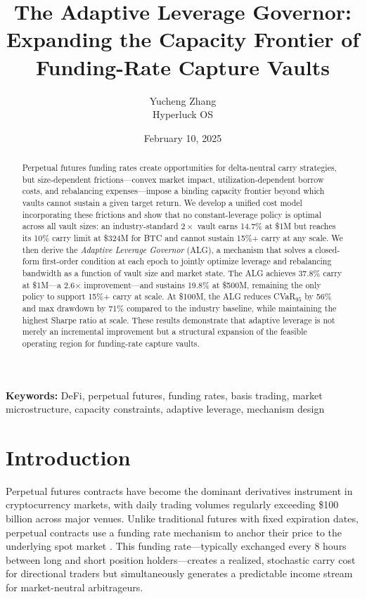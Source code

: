 \documentclass[11pt]{article}
\title{The Adaptive Leverage Governor:\\ Expanding the Capacity Frontier of Funding-Rate Capture Vaults}
\author{Yucheng Zhang\\[0.2cm]
Hyperluck OS}
\date{February 10, 2025}
\begin{document}
\maketitle

\begin{abstract}
Perpetual futures funding rates create opportunities for delta-neutral carry strategies, but size-dependent frictions---convex market impact, utilization-dependent borrow costs, and rebalancing expenses---impose a binding capacity frontier beyond which vaults cannot sustain a given target return. We develop a unified cost model incorporating these frictions and show that no constant-leverage policy is optimal across all vault sizes: an industry-standard $2\times$ vault earns 14.7\% at \$1M but reaches its 10\% carry limit at \$324M for BTC and cannot sustain 15\%+ carry at any scale. We then derive the \textit{Adaptive Leverage Governor} (ALG), a mechanism that solves a closed-form first-order condition at each epoch to jointly optimize leverage and rebalancing bandwidth as a function of vault size and market state. The ALG achieves 37.8\% carry at \$1M---a 2.6$\times$ improvement---and sustains 19.8\% at \$500M, remaining the only policy to support 15\%+ carry at scale. At \$100M, the ALG reduces CVaR$_{95}$ by 56\% and max drawdown by 71\% compared to the industry baseline, while maintaining the highest Sharpe ratio at scale. These results demonstrate that adaptive leverage is not merely an incremental improvement but a structural expansion of the feasible operating region for funding-rate capture vaults.
\end{abstract}

\textbf{Keywords:} DeFi, perpetual futures, funding rates, basis trading, market microstructure, capacity constraints, adaptive leverage, mechanism design

\section{Introduction}

Perpetual futures contracts have become the dominant derivatives instrument in cryptocurrency markets, with daily trading volumes regularly exceeding \$100 billion across major venues. Unlike traditional futures with fixed expiration dates, perpetual contracts use a funding rate mechanism to anchor their price to the underlying spot market \citep{perpetuals_mechanism}. This funding rate---typically exchanged every 8 hours between long and short position holders---creates a realized, stochastic carry cost for directional traders but simultaneously generates a predictable income stream for market-neutral arbitrageurs.
\end{document}
